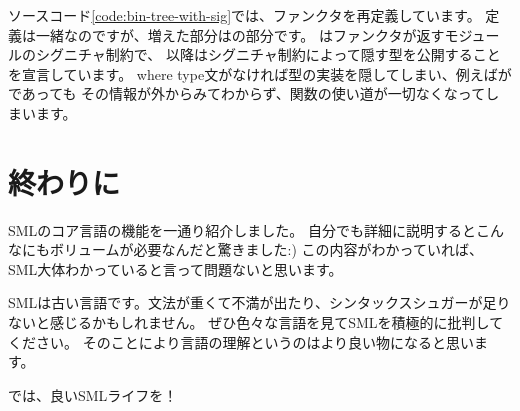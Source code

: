 \documentclass[11pt,a4paper]{jarticle}
\begin{document}
ソースコード\ref{code:bin-tree-with-sig}では、ファンクタを再定義しています。
定義は一緒なのですが、増えた部分はの部分です。
はファンクタが返すモジュールのシグニチャ制約で、
以降はシグニチャ制約によって隠す型を公開することを宣言しています。
where type文がなければ型の実装を隠してしまい、例えばがであっても
その情報が外からみてわからず、関数の使い道が一切なくなってしまいます。






\section{終わりに}
SMLのコア言語の機能を一通り紹介しました。
自分でも詳細に説明するとこんなにもボリュームが必要なんだと驚きました:)
この内容がわかっていれば、SML大体わかっていると言って問題ないと思います。

SMLは古い言語です。文法が重くて不満が出たり、シンタックスシュガーが足りないと感じるかもしれません。
ぜひ色々な言語を見てSMLを積極的に批判してください。
そのことにより言語の理解というのはより良い物になると思います。

では、良いSMLライフを！
\end{document}
